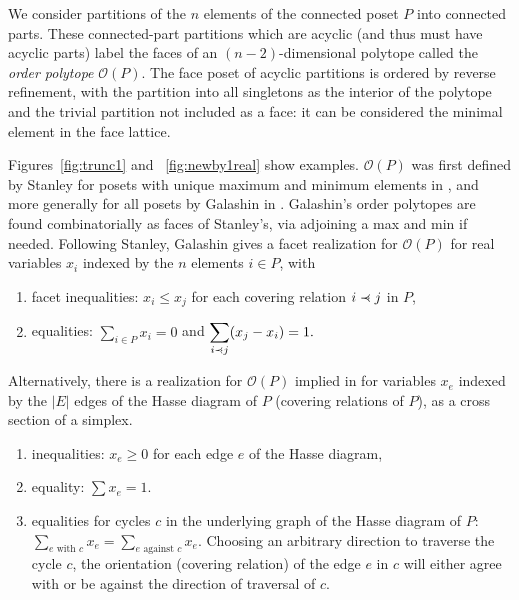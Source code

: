 \documentclass{article}
\newcommand{\precdot}{\prec\mathrel{\mkern-5mu}\mathrel{\cdot}}
\begin{document}
\begin{defn}
    We consider partitions of the $n$ elements of the connected poset $P$ into connected parts. These connected-part partitions which are acyclic (and thus must have acyclic parts) label the faces of an $(n-2)$-dimensional polytope called the \textit{order polytope} $\mathcal{O}(P).$ The face poset of acyclic partitions is ordered by reverse refinement, with the partition into all singletons as the interior of the polytope and the trivial partition not included as a face: it can be considered the minimal element in the face lattice.
\end{defn}
 Figures~\ref{fig:trunc1} and ~\ref{fig:newby1real} show examples. $\mathcal{O}(P)$ was first defined by Stanley for posets with unique maximum and minimum elements in \cite{stanley}, and more generally for all posets by Galashin in \cite{galashin}.  Galashin's order polytopes are found combinatorially as faces of Stanley's, via adjoining a max and min if needed.
 Following Stanley, Galashin gives a facet realization for $\mathcal{O}(P)$  for real variables $x_i$ indexed by the $n$ elements $i\in P$, with  
 \begin{enumerate}
     \item facet inequalities: $x_i\le x_j$ for each covering relation $i\precdot j$ in $P$,
     \item equalities: $\displaystyle{\sum_{i\in P}x_i = 0}$ and  $\displaystyle{\sum_{i \precdot j}(x_j-x_i) = 1.}$
 \end{enumerate}
 Alternatively, there is a realization for $\mathcal{O}(P)$  implied in \cite[Sec. 8.2]{mppfull} for  variables $x_{e}$ indexed by the $|E|$ edges of the Hasse diagram of $P$ (covering relations of $P$), as a cross section of a simplex. 
 \begin{enumerate}
     \item inequalities: $x_{e} \ge 0$ for each edge $e$ of the Hasse diagram,
     \item equality: $\displaystyle{\sum x_{e} = 1.}$
     \item equalities for cycles $c$ in the underlying graph of the Hasse diagram of $P$:  $\displaystyle{\sum_{e \text{ with }c }x_e = \sum_{e \text{ against } c}x_e }.$  Choosing an arbitrary direction to traverse the cycle $c$, the orientation (covering relation) of the edge $e$ in $c$ will either agree with or be against the direction of traversal of $c.$
 \end{enumerate}

\end{document}
